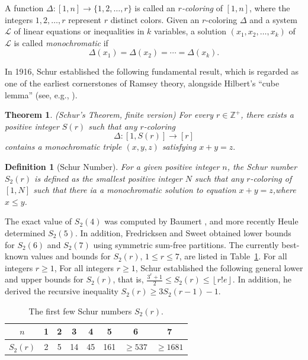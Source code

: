 \documentclass[twoside, 12pt]{article}
\newtheorem{theorem}{Theorem}
\newtheorem{definition}{Definition}[section]
\begin{document}
A function $\Delta: [1,n]\longrightarrow \{1,2,\ldots,r\}$ is called an \emph{$r$-coloring} of $[1,n]$, where the integers $1,2,\ldots,r$ represent $r$ distinct colors. Given an $r$-coloring $\Delta$ and a system $\mathcal{L}$ of linear equations or inequalities in $k$ variables, a solution $(x_1,x_2,\ldots,x_k)$ of $\mathcal{L}$ is called \emph{monochromatic} if
\[
\Delta(x_1)=\Delta(x_2)=\cdots=\Delta(x_k).
\]

In 1916, Schur \cite{Schur16} established the following fundamental result, which is regarded as one of the earliest cornerstones of Ramsey theory, alongside Hilbert’s “cube lemma” (see, e.g., \cite{Soifer00}).

\begin{theorem}{\upshape \cite{Schur16}}\label{th-Schur16-1}
{\upshape (Schur's Theorem, finite version)}
For every $r \in \mathbb{Z}^+$, there exists a positive integer $S(r)$ such that any $r$-coloring
\[
\Delta:[1,S(r)] \longrightarrow [r]
\]
contains a monochromatic triple $(x,y,z)$ satisfying $x+y=z.$
\end{theorem}



\begin{definition}[Schur Number]
For a given positive integer $n$, the \emph{Schur number} $S_2(r)$ is defined as the smallest positive integer $N$ such that any $r$-coloring of $[1,N]$ such that there ia a monochromatic solution to equation $x+y=z$,where $x \leq y$.
\end{definition}

The exact value of $S_2(4)$ was computed by Baumert \cite{Ba61}, and more recently Heule \cite{He18} determined $S_2(5)$. In addition, Fredricksen and Sweet \cite{FS00} obtained lower bounds for $S_2(6)$ and $S_2(7)$ using symmetric sum-free partitions. The currently best-known values and bounds for $S_2(r)$, $1 \leq r \leq 7$, are listed in Table~\ref{table-1}.  For all integers \( r \geq 1 \), For all integers \( r \geq 1 \), Schur  \cite{Schur16} established the following general lower and upper bounds for \( S_2(r) \), that is,
$\frac{3^r + 1}{2} \leq S_2(r) \leq \left\lfloor r! e \right\rfloor.$
In addition, he derived the recursive inequality $S_2(r) \geq 3S_2(r - 1) - 1.$


\begin{table}[h]
\centering
\caption{The first few Schur numbers $S_2(r)$.}
\begin{tabular}{c ccccccc}
\toprule
$n$ & 1 & 2 & 3 & 4 & 5 & 6 & 7 \\
\midrule
$S_2(r)$ & 2 & 5 & 14 & 45 & 161 & $\ge 537$ & $\ge 1681$ \\
\bottomrule
\end{tabular}
\label{table-1}
\end{table}
\end{document}
